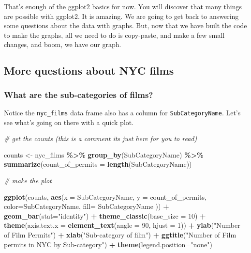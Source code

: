 \documentclass[
]{book}
\newenvironment{Shaded}{\begin{snugshade}}{\end{snugshade}}
\newcommand{\AttributeTok}[1]{\textcolor[rgb]{0.13,0.29,0.53}{#1}}
\newcommand{\CommentTok}[1]{\textcolor[rgb]{0.56,0.35,0.01}{\textit{#1}}}
\newcommand{\DecValTok}[1]{\textcolor[rgb]{0.00,0.00,0.81}{#1}}
\newcommand{\FunctionTok}[1]{\textcolor[rgb]{0.13,0.29,0.53}{\textbf{#1}}}
\newcommand{\NormalTok}[1]{#1}
\newcommand{\OtherTok}[1]{\textcolor[rgb]{0.56,0.35,0.01}{#1}}
\newcommand{\SpecialCharTok}[1]{\textcolor[rgb]{0.81,0.36,0.00}{\textbf{#1}}}
\newcommand{\StringTok}[1]{\textcolor[rgb]{0.31,0.60,0.02}{#1}}
\begin{document}
That's enough of the ggplot2 basics for now. You will discover that many things are possible with ggplot2. It is amazing. We are going to get back to answering some questions about the data with graphs. But, now that we have built the code to make the graphs, all we need to do is copy-paste, and make a few small changes, and boom, we have our graph.

\hypertarget{more-questions-about-nyc-films}{%
\subsection{More questions about NYC films}\label{more-questions-about-nyc-films}}

\hypertarget{what-are-the-sub-categories-of-films}{%
\subsubsection{What are the sub-categories of films?}\label{what-are-the-sub-categories-of-films}}

Notice the \texttt{nyc\_films} data frame also has a column for \texttt{SubCategoryName}. Let's see what's going on there with a quick plot.

\begin{Shaded}
\begin{Highlighting}[]
\CommentTok{\# get the counts (this is a comment it\textquotesingle{}s just here for you to read)}

\NormalTok{counts }\OtherTok{\textless{}{-}}\NormalTok{ nyc\_films }\SpecialCharTok{\%\textgreater{}\%}
          \FunctionTok{group\_by}\NormalTok{(SubCategoryName) }\SpecialCharTok{\%\textgreater{}\%}
          \FunctionTok{summarize}\NormalTok{(}\AttributeTok{count\_of\_permits =} \FunctionTok{length}\NormalTok{(SubCategoryName))}

\CommentTok{\# make the plot}

\FunctionTok{ggplot}\NormalTok{(counts, }\FunctionTok{aes}\NormalTok{(}\AttributeTok{x =}\NormalTok{ SubCategoryName, }\AttributeTok{y =}\NormalTok{ count\_of\_permits, }
                   \AttributeTok{color=}\NormalTok{SubCategoryName, }
                   \AttributeTok{fill=}\NormalTok{ SubCategoryName )) }\SpecialCharTok{+}
  \FunctionTok{geom\_bar}\NormalTok{(}\AttributeTok{stat=}\StringTok{"identity"}\NormalTok{) }\SpecialCharTok{+} 
  \FunctionTok{theme\_classic}\NormalTok{(}\AttributeTok{base\_size =} \DecValTok{10}\NormalTok{) }\SpecialCharTok{+}
  \FunctionTok{theme}\NormalTok{(}\AttributeTok{axis.text.x =} \FunctionTok{element\_text}\NormalTok{(}\AttributeTok{angle =} \DecValTok{90}\NormalTok{, }\AttributeTok{hjust =} \DecValTok{1}\NormalTok{)) }\SpecialCharTok{+}
  \FunctionTok{ylab}\NormalTok{(}\StringTok{"Number of Film Permits"}\NormalTok{) }\SpecialCharTok{+} 
  \FunctionTok{xlab}\NormalTok{(}\StringTok{"Sub{-}category of film"}\NormalTok{) }\SpecialCharTok{+}
  \FunctionTok{ggtitle}\NormalTok{(}\StringTok{"Number of Film permits in NYC by Sub{-}category"}\NormalTok{) }\SpecialCharTok{+}
  \FunctionTok{theme}\NormalTok{(}\AttributeTok{legend.position=}\StringTok{"none"}\NormalTok{) }
\end{Highlighting}
\end{Shaded}
\end{document}

